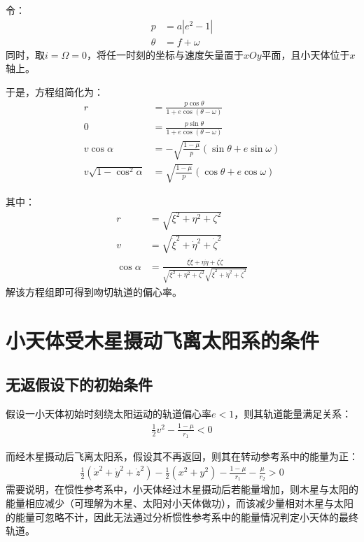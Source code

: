 令：
\begin{align}
    p&=a\left| e^2-1\right|
    \\\theta&=f+\omega
\end{align}
同时，取$i=\Omega=0$，将任一时刻的坐标与速度矢量置于$xOy$平面，且小天体位于$x$轴上。

于是，方程组简化为：
\begin{align}
    r&=\frac{p\cos\theta}{1+e\cos(\theta-\omega)}
    \\0&=\frac{p\sin\theta}{1+e\cos(\theta-\omega)}
    \\v\cos\alpha&=-\sqrt{\frac{1-\mu}{p}}(\sin\theta+e\sin\omega)
    \\v\sqrt{1-\cos^2\alpha}&=\sqrt{\frac{1-\mu}{p}}(\cos\theta+e\cos\omega)
\end{align}

其中：
\begin{align}
    r&=\sqrt{\xi^2+\eta^2+\zeta^2}
    \\v&=\sqrt{\dot{\xi}^2+\dot{\eta}^2+\dot{\zeta}^2}
    \\\cos\alpha&=\frac{\xi\dot{\xi}+\eta\dot{\eta}+\zeta\dot{\zeta}}{\sqrt{\xi^2+\eta^2+\zeta^2}\sqrt{\dot{\xi}^2+\dot{\eta}^2+\dot{\zeta}^2}}
\end{align}
解该方程组即可得到吻切轨道的偏心率。

\section{小天体受木星摄动飞离太阳系的条件}

\subsection{无返假设下的初始条件}

假设一小天体初始时刻绕太阳运动的轨道偏心率$e<1$，则其轨道能量满足关系：
\begin{align}
    \frac{1}{2}v^2-\frac{1-\mu}{r_1}<0
\end{align}

而经木星摄动后飞离太阳系，假设其不再返回，则其在转动参考系中的能量为正：
\begin{align}
    \frac{1}{2}\left(\dot{x}^2+\dot{y}^2+\dot{z}^2\right)-\frac{1}{2}\left( x^2+y^2\right)-\frac{1-\mu}{r_1}-\frac{\mu}{r_2}>0
\end{align}
需要说明，在惯性参考系中，小天体经过木星摄动后若能量增加，则木星与太阳的能量相应减少（可理解为木星、太阳对小天体做功），而该减少量相对木星与太阳的能量可忽略不计，因此无法通过分析惯性参考系中的能量情况判定小天体的最终轨道。

